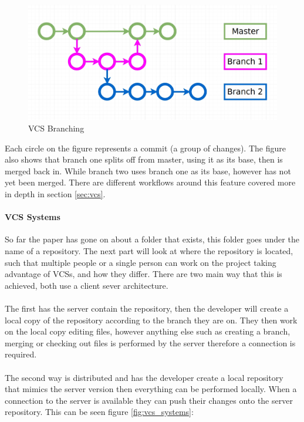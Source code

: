\begin{figure}[H]
	\centering
	\includegraphics[scale=0.30]{images/branching.jpg}
	\caption{VCS Branching}
	\label{fig:vcs_branching}
\end{figure}

Each circle on the figure represents a commit (a group of changes). The figure also shows that branch one splits off from master, using it as its base, then is merged back in. While branch two uses branch one as its base, however has not yet been merged. There are different workflows around this feature covered more in depth in section \ref{sec:vcs}.

\paragraph{VCS Systems}
So far the paper has gone on about a folder that exists, this folder goes under the name of a repository. The next part will look at where the repository is located, such that multiple people or a single person can work on the project taking advantage of VCSs, and how they differ. There are two main way that this is achieved, both use a client sever architecture. 
\\\\
The first has the server contain the repository, then the developer will create a local copy of the repository according to the branch they are on. They then work on the local copy editing files, however anything else such as creating a branch, merging or checking out files is performed by the server therefore a connection is required.
\\\\
The second way is distributed and has the developer create a local repository that mimics the server version then everything can be performed locally. When a connection to the server is available they can push their changes onto the server repository. This can be seen figure \ref{fig:vcs_systems}:

